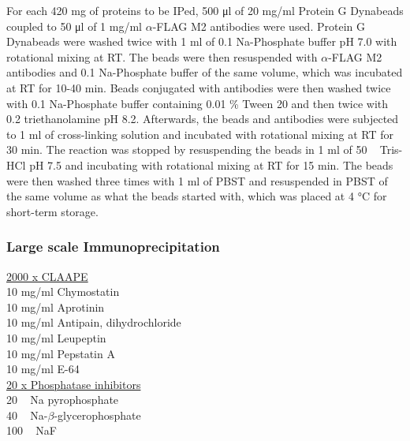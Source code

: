 For each 420 \si{\milli\gram} of proteins to be IPed, 500 \si{\micro\litre} of 20 \si{\milli\gram/\milli\litre} Protein G Dynabeads coupled to 50 \si{\micro\litre} of 1 \si{\milli\gram/\milli\litre} $\alpha$-FLAG M2 antibodies were used. Protein G Dynabeads were washed twice with 1 \si{\milli\litre} of 0.1 \si{\Molar} Na-Phosphate buffer pH 7.0 with rotational mixing at RT. The beads were then resuspended with $\alpha$-FLAG M2 antibodies and 0.1 \si{\Molar} Na-Phosphate buffer of the same volume, which was incubated at RT for 10-40 \si{\minute}. Beads conjugated with antibodies were then washed twice with 0.1 \si{\Molar} Na-Phosphate buffer containing 0.01 \% Tween 20 and then twice with 0.2 \si{\Molar} triethanolamine pH 8.2. Afterwards, the beads and antibodies were subjected to 1 \si{\milli\litre} of cross-linking solution and incubated with rotational mixing at RT for 30 \si{\minute}. The reaction was stopped by resuspending the beads in 1 \si{\milli\litre} of 50 \si{\milli\Molar} Tris-HCl pH 7.5 and incubating with rotational mixing at RT for 15 \si{\minute}. The beads were then washed three times with 1 \si{\milli\litre} of PBST and resuspended in PBST of the same volume as what the beads started with, which was placed at 4 \si{\celsius} for short-term storage. 


\subsubsection{Large scale Immunoprecipitation}

\underline{2000 x CLAAPE}\\
10 \si{\milli\gram/\milli\litre} Chymostatin \\
10 \si{\milli\gram/\milli\litre} Aprotinin \\
10 \si{\milli\gram/\milli\litre} Antipain, dihydrochloride \\
10 \si{\milli\gram/\milli\litre} Leupeptin \\
10 \si{\milli\gram/\milli\litre} Pepstatin A \\
10 \si{\milli\gram/\milli\litre} E-64  \\

\underline{20 x Phosphatase inhibitors}\\
20 \si{\milli\Molar} Na pyrophosphate\\
40 \si{\milli\Molar} Na-$\beta$-glycerophosphate\\
100 \si{\milli\Molar} NaF\\

